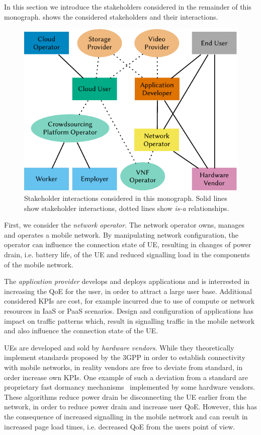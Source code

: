 In this section we introduce the stakeholders considered in the remainder of this monograph.
 shows the considered stakeholders and their interactions.

\begin{figure}
\centering
\includegraphics{figures/stakeholders}
\caption{Stakeholder interactions considered in this monograph. Solid lines show stakeholder interactions, dotted lines show \emph{is-a} relationships.}\label{fig:introduction:stakeholders}
\end{figure}

First, we consider the \emph{network operator}.
The network operator owns, manages and operates a mobile network.
By manipulating network configuration, the operator can influence the connection state of \gls{UE}, resulting in changes of power drain, i.e. battery life, of the \gls{UE} and reduced signalling load in the components of the mobile network.

The \emph{application provider} develops and deploys applications and is interrested in increasing the \gls{QoE} for the user, in order to attract a large user base.
Additional considered \glspl{KPI} are cost, for example incurred due to use of compute or network resources in \gls{IaaS} or \gls{PaaS} scenarios.
Design and configuration of applications has impact on traffic patterns which, result in signalling traffic in the mobile network and also influence the connection state of the \gls{UE}.


\glspl{UE} are developed and sold by \emph{hardware vendors}.
While they theoretically implement standards proposed by the \gls{3GPP} in order to establish connectivity with mobile networks, in reality vendors are free to deviate from standard, in order increase own \glspl{KPI}.
One example of such a deviation from a standard are proprietary fast dormancy mechanisms~\cite{GSM2010} implemented by some hardware vendors.
These algorithms reduce power drain be disconnecting the \gls{UE} earlier from the network, in order to reduce power drain and increase user \gls{QoE}.
However, this has the consequence of increased signalling in the mobile network and can result in increased page load times, i.e. decreased \gls{QoE} from the users point of view.

